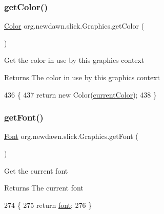 \subsubsection{\texorpdfstring{get\+Color()}{getColor()}}
{\footnotesize\ttfamily \mbox{\hyperlink{classorg_1_1newdawn_1_1slick_1_1_color}{Color}} org.\+newdawn.\+slick.\+Graphics.\+get\+Color (\begin{DoxyParamCaption}{ }\end{DoxyParamCaption})\hspace{0.3cm}{\ttfamily [inline]}}

Get the color in use by this graphics context

\begin{DoxyReturn}{Returns}
The color in use by this graphics context 
\end{DoxyReturn}

\begin{DoxyCode}
436                             \{
437         \textcolor{keywordflow}{return} \textcolor{keyword}{new} Color(\mbox{\hyperlink{classorg_1_1newdawn_1_1slick_1_1_graphics_add4b542e574390a735aad66468135d5a}{currentColor}});
438     \}
\end{DoxyCode}
\mbox{\label{classorg_1_1newdawn_1_1slick_1_1_graphics_af9f0de1e447b9b89efa43908b4ace819}} 
\subsubsection{\texorpdfstring{get\+Font()}{getFont()}}
{\footnotesize\ttfamily \mbox{\hyperlink{interfaceorg_1_1newdawn_1_1slick_1_1_font}{Font}} org.\+newdawn.\+slick.\+Graphics.\+get\+Font (\begin{DoxyParamCaption}{ }\end{DoxyParamCaption})\hspace{0.3cm}{\ttfamily [inline]}}

Get the current font

\begin{DoxyReturn}{Returns}
The current font 
\end{DoxyReturn}

\begin{DoxyCode}
274                           \{
275         \textcolor{keywordflow}{return} \mbox{\hyperlink{classorg_1_1newdawn_1_1slick_1_1_graphics_a3fc899a622817cc89e2c9f0111243b65}{font}};
276     \}
\end{DoxyCode}
\mbox{\label{classorg_1_1newdawn_1_1slick_1_1_graphics_a76e5de3b826bc9542b0b70fc12dd4f14}} 

